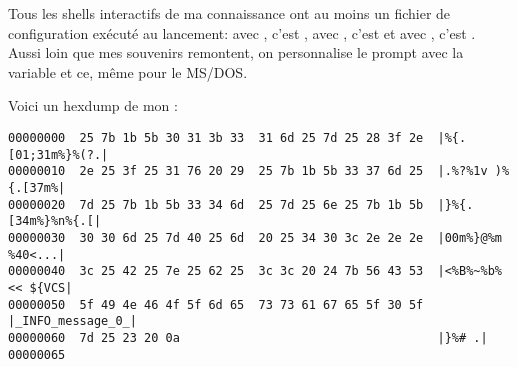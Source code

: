 Tous les shells interactifs de ma connaissance ont au moins un fichier de configuration exécuté au lancement: avec \zsh, c'est , avec \bash, c'est  et avec \csh, c'est . Aussi loin que mes souvenirs remontent, on personnalise le prompt avec la variable  et ce, même pour le MS/DOS.

Voici un hexdump de mon   :

\begin{lstlisting}[caption=mon prompt]
00000000  25 7b 1b 5b 30 31 3b 33  31 6d 25 7d 25 28 3f 2e  |%{.[01;31m%}%(?.|
00000010  2e 25 3f 25 31 76 20 29  25 7b 1b 5b 33 37 6d 25  |.%?%1v )%{.[37m%|
00000020  7d 25 7b 1b 5b 33 34 6d  25 7d 25 6e 25 7b 1b 5b  |}%{.[34m%}%n%{.[|
00000030  30 30 6d 25 7d 40 25 6d  20 25 34 30 3c 2e 2e 2e  |00m%}@%m %40<...|
00000040  3c 25 42 25 7e 25 62 25  3c 3c 20 24 7b 56 43 53  |<%B%~%b%<< ${VCS|
00000050  5f 49 4e 46 4f 5f 6d 65  73 73 61 67 65 5f 30 5f  |_INFO_message_0_|
00000060  7d 25 23 20 0a                                    |}%# .|
00000065
\end{lstlisting}
